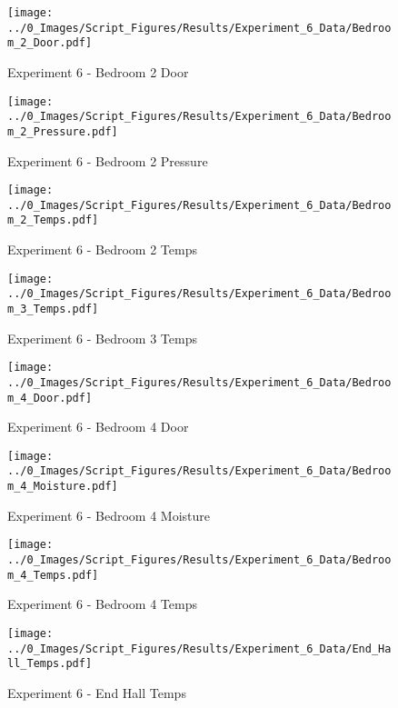 	\clearpage

	\begin{figure}[H]
		\centering
		\texttt{[image: ../0\_Images/Script\_Figures/Results/Experiment\_6\_Data/Bedroom\_2\_Door.pdf]}
		\caption[]{Experiment 6 - Bedroom 2 Door}
	\end{figure}
 

	\begin{figure}[H]
		\centering
		\texttt{[image: ../0\_Images/Script\_Figures/Results/Experiment\_6\_Data/Bedroom\_2\_Pressure.pdf]}
		\caption[]{Experiment 6 - Bedroom 2 Pressure}
	\end{figure}
 
	\clearpage

	\begin{figure}[H]
		\centering
		\texttt{[image: ../0\_Images/Script\_Figures/Results/Experiment\_6\_Data/Bedroom\_2\_Temps.pdf]}
		\caption[]{Experiment 6 - Bedroom 2 Temps}
	\end{figure}
 

	\begin{figure}[H]
		\centering
		\texttt{[image: ../0\_Images/Script\_Figures/Results/Experiment\_6\_Data/Bedroom\_3\_Temps.pdf]}
		\caption[]{Experiment 6 - Bedroom 3 Temps}
	\end{figure}
 
	\clearpage

	\begin{figure}[H]
		\centering
		\texttt{[image: ../0\_Images/Script\_Figures/Results/Experiment\_6\_Data/Bedroom\_4\_Door.pdf]}
		\caption[]{Experiment 6 - Bedroom 4 Door}
	\end{figure}
 

	\begin{figure}[H]
		\centering
		\texttt{[image: ../0\_Images/Script\_Figures/Results/Experiment\_6\_Data/Bedroom\_4\_Moisture.pdf]}
		\caption[]{Experiment 6 - Bedroom 4 Moisture}
	\end{figure}
 
	\clearpage

	\begin{figure}[H]
		\centering
		\texttt{[image: ../0\_Images/Script\_Figures/Results/Experiment\_6\_Data/Bedroom\_4\_Temps.pdf]}
		\caption[]{Experiment 6 - Bedroom 4 Temps}
	\end{figure}
 

	\begin{figure}[H]
		\centering
		\texttt{[image: ../0\_Images/Script\_Figures/Results/Experiment\_6\_Data/End\_Hall\_Temps.pdf]}
		\caption[]{Experiment 6 - End Hall Temps}
	\end{figure}
 
